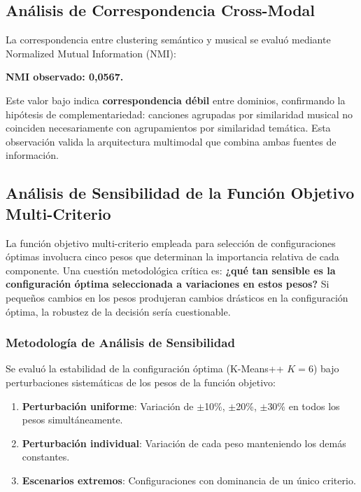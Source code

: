 \subsection{Análisis de Correspondencia Cross-Modal}
\label{subsec:correspondencia-crossmodal}

La correspondencia entre clustering semántico y musical se evaluó mediante Normalized Mutual Information (NMI):

\textbf{NMI observado: 0,0567.}

Este valor bajo indica \textbf{correspondencia débil} entre dominios, confirmando la hipótesis de complementariedad: canciones agrupadas por similaridad musical no coinciden necesariamente con agrupamientos por similaridad temática. Esta observación valida la arquitectura multimodal que combina ambas fuentes de información.

\subsection{Análisis de Sensibilidad de la Función Objetivo Multi-Criterio}
\label{subsec:sensibilidad-objetivo}

La función objetivo multi-criterio empleada para selección de configuraciones óptimas involucra cinco pesos que determinan la importancia relativa de cada componente. Una cuestión metodológica crítica es: \textbf{¿qué tan sensible es la configuración óptima seleccionada a variaciones en estos pesos?} Si pequeños cambios en los pesos produjeran cambios drásticos en la configuración óptima, la robustez de la decisión sería cuestionable.

\subsubsection{Metodología de Análisis de Sensibilidad}

Se evaluó la estabilidad de la configuración óptima (K-Means++ $K=6$) bajo perturbaciones sistemáticas de los pesos de la función objetivo:

\begin{enumerate}
    \item \textbf{Perturbación uniforme}: Variación de $\pm$10\%, $\pm$20\%, $\pm$30\% en todos los pesos simultáneamente.
    \item \textbf{Perturbación individual}: Variación de cada peso manteniendo los demás constantes.
    \item \textbf{Escenarios extremos}: Configuraciones con dominancia de un único criterio.
\end{enumerate}

